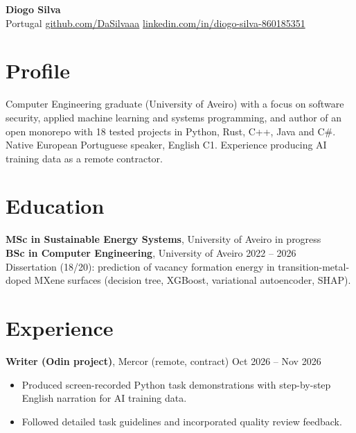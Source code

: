 \documentclass[10pt,a4paper]{article}
\begin{document}
{\LARGE\bfseries Diogo Silva}\\[2pt]
Portugal \textbar{} \href{https://github.com/DaSilvaaa}{github.com/DaSilvaaa} \textbar{} \href{https://www.linkedin.com/in/diogo-silva-860185351}{linkedin.com/in/diogo-silva-860185351}

\section*{Profile}
Computer Engineering graduate (University of Aveiro) with a focus on software security, applied machine learning and systems programming, and author of an open monorepo with 18 tested projects in Python, Rust, C++, Java and C\#. Native European Portuguese speaker, English C1. Experience producing AI training data as a remote contractor.

\section*{Education}
\textbf{MSc in Sustainable Energy Systems}, University of Aveiro \hfill in progress\\
\textbf{BSc in Computer Engineering}, University of Aveiro \hfill 2022 -- 2026\\
Dissertation (18/20): prediction of vacancy formation energy in transition-metal-doped MXene surfaces (decision tree, XGBoost, variational autoencoder, SHAP).

\section*{Experience}
\textbf{Writer (Odin project)}, Mercor (remote, contract) \hfill Oct 2026 -- Nov 2026
\begin{itemize}
  \item Produced screen-recorded Python task demonstrations with step-by-step English narration for AI training data.
  \item Followed detailed task guidelines and incorporated quality review feedback.
\end{itemize}
\end{document}
